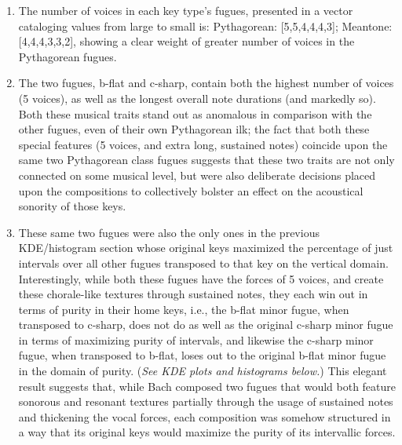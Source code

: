 \begin{enumerate}
\def\labelenumi{\arabic{enumi}.}
\tightlist
\item
  The number of voices in each key type's fugues, presented in a vector
  cataloging values from large to small is: Pythagorean:
  {[}5,5,4,4,4,3{]}; Meantone: {[}4,4,4,3,3,2{]}, showing a clear weight
  of greater number of voices in the Pythagorean fugues.
\item
  The two fugues, b-flat and c-sharp, contain both the highest number of
  voices (5 voices), as well as the longest overall note durations (and
  markedly so). Both these musical traits stand out as anomalous in
  comparison with the other fugues, even of their own Pythagorean ilk;
  the fact that both these special features (5 voices, and extra long,
  sustained notes) coincide upon the same two Pythagorean class fugues
  suggests that these two traits are not only connected on some musical
  level, but were also deliberate decisions placed upon the compositions
  to collectively bolster an effect on the acoustical sonority of those
  keys.
\item
  These same two fugues were also the only ones in the previous
  KDE/histogram section whose original keys maximized the percentage of
  just intervals over all other fugues transposed to that key on the
  vertical domain. Interestingly, while both these fugues have the
  forces of 5 voices, and create these chorale-like textures through
  sustained notes, they each win out in terms of purity in their home
  keys, i.e., the b-flat minor fugue, when transposed to c-sharp, does
  not do as well as the original c-sharp minor fugue in terms of
  maximizing purity of intervals, and likewise the c-sharp minor fugue,
  when transposed to b-flat, loses out to the original b-flat minor
  fugue in the domain of purity. (\emph{See KDE plots and histograms
  below.}) This elegant result suggests that, while Bach composed two
  fugues that would both feature sonorous and resonant textures
  partially through the usage of sustained notes and thickening the
  vocal forces, each composition was somehow structured in a way that
  its original keys would maximize the purity of its intervallic forces.
\end{enumerate}


    \begin{center}
    \end{center}
    


